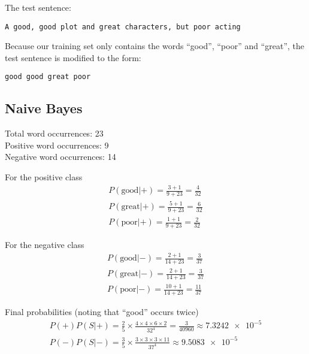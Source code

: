 The test sentence:
\begin{verbatim}
A good, good plot and great characters, but poor acting
\end{verbatim}

Because our training set only contains the words ``good'', ``poor'' and
``great'', the test sentence is modified to the form:
\begin{verbatim}
good good great poor
\end{verbatim}

\subsection*{Naive Bayes}
Total word occurrences: 23 \\
Positive word occurrences: 9 \\
Negative word occurrences: 14

For the positive class
\begin{equation}
  \begin{split}
    P(\text{good}|+) = \frac{3+1}{9+23} = \frac{4}{32} \\
    P(\text{great}|+) = \frac{5+1}{9+23} = \frac{6}{32} \\
    P(\text{poor}|+) = \frac{1+1}{9+23} = \frac{2}{32}
  \end{split}
\end{equation}

For the negative class
\begin{equation}
  \begin{split}
    P(\text{good}|-) = \frac{2+1}{14+23} = \frac{3}{37} \\
    P(\text{great}|-) = \frac{2+1}{14+23} = \frac{3}{37} \\
    P(\text{poor}|-) = \frac{10+1}{14+23} = \frac{11}{37}
  \end{split}
\end{equation}

Final probabilities (noting that ``good'' occurs twice)
\begin{equation}
  \begin{split}
    P(+)P(S|+) = \frac{2}{5} \times \frac{4 \times 4 \times 6 \times 2}{32^4} =
    \frac{3}{40960} \approx \num{7.3242e-5} \\
    P(-)P(S|-) = \frac{3}{5} \times \frac{3 \times 3 \times 3 \times 11}{37^4} 
    \approx \num{9.5083e-5}
  \end{split}
\end{equation}

